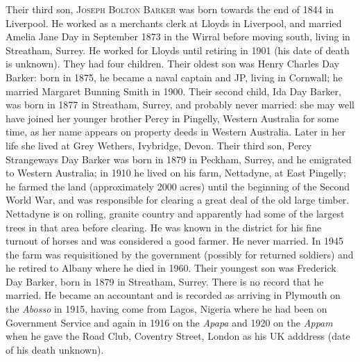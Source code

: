 Their third son, \textsc{Joseph Bolton Barker} was born towards the end of 1844 in Liverpool. He worked as a merchants clerk at Lloyds in Liverpool, and married Amelia Jane Day in September 1873 in the Wirral before moving south, living in Streatham, Surrey. He worked for Lloyds until retiring in 1901 (his date of death is unknown). They had four children. Their oldest son was Henry Charles Day Barker: born in 1875, he became a naval captain and JP, living in Cornwall; he married Margaret Bunning Smith in 1900. Their second child, Ida Day Barker,  was born in 1877 in Streatham, Surrey, and probably never married: she may well have joined her younger brother Percy in Pingelly, Western Australia for some time, as her name appears on property deeds in Western Australia. Later in her life she lived at Grey Wethers, Ivybridge, Devon. Their third son, Percy Strangeways Day Barker was born in 1879 in Peckham, Surrey, and he emigrated to Western Australia; in 1910 he lived  on his farm, Nettadyne, at East Pingelly; he farmed the land (approximately 2000 acres) until the beginning of the Second World War, and was responsible for clearing a great deal of the old large timber. Nettadyne is on rolling, granite country and apparently had some of the largest trees in that area before clearing. He was known in the district for his fine turnout of horses and was considered a good farmer. He never married. In 1945 the farm was requisitioned by the government (possibly for returned soldiers) and he retired to Albany where he died in 1960. Their youngest son was Frederick Day Barker, born in 1879 in	Streatham, Surrey. There is no record that he married. He became an accountant and is recorded as arriving in Plymouth on the \textit{Abosso} in 1915, having come from Lagos, Nigeria where he had been on Government Service and again in 1916 on the \textit{Apapa} and 1920 on the \textit{Appam} when he gave the Road Club, Coventry Street, London as his UK adddress (date of his death unknown).



